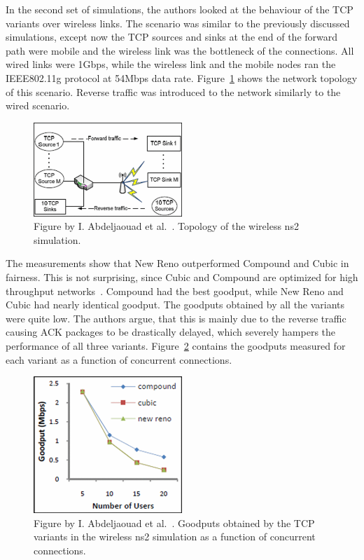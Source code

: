 In the second set of simulations, the authors looked at the behaviour of the TCP variants over wireless links. The scenario was similar to the previously discussed simulations, except now the TCP sources and sinks at the end of the forward path were mobile and the wireless link was the bottleneck of the connections. All wired links were 1Gbps, while the wireless link and the mobile nodes ran the IEEE802.11g protocol at 54Mbps data rate. Figure~\ref{fig:topology3} shows the network topology of this scenario. Reverse traffic was introduced to the network similarly to the wired scenario.     

\begin{figure}
	\includegraphics[width=0.5\textwidth]{images/abdeljaouad10_topology_3.png}
	\caption{Figure by I. Abdeljaouad et al.~\cite{Abdeljaouad10}. Topology of the wireless ns2 simulation.}
	\label{fig:topology3}
\end{figure}

The measurements show that New Reno outperformed Compound and Cubic in fairness. This is not surprising, since Cubic and Compound are optimized for high throughput networks~\cite{Ha08,Tan05}. Compound had the best goodput, while New Reno and Cubic had nearly identical goodput. The goodputs obtained by all the variants were quite low. The authors argue, that this is mainly due to the reverse traffic causing ACK packages to be drastically delayed, which severely hampers the performance of all three variants. Figure~\ref{fig:goodput} contains the goodputs measured for each variant as a function of concurrent connections.

\begin{figure}
	\includegraphics[width=0.5\textwidth]{images/abdeljaouad10_goodput.png}
	\caption{Figure by I. Abdeljaouad et al.~\cite{Abdeljaouad10}. Goodputs obtained by the TCP variants in the wireless ns2 simulation as a function of concurrent connections. }
	\label{fig:goodput}
\end{figure}

